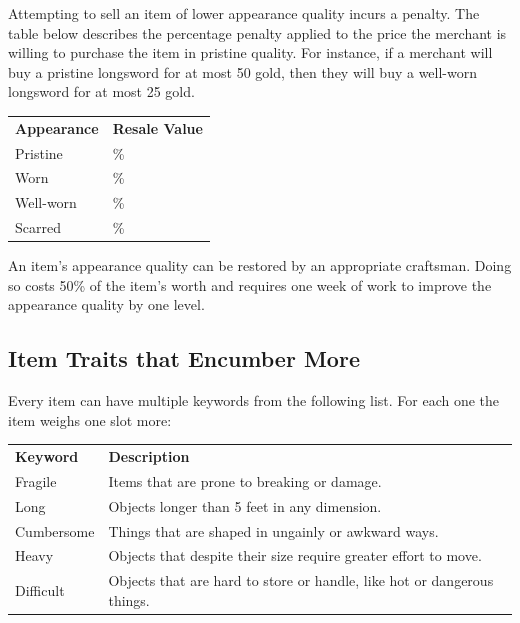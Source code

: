 \documentclass[twoside]{article}
\begin{document}
\bigbreak

Attempting to sell an item of lower appearance quality incurs a penalty. The table below describes the percentage penalty applied to the price the merchant is willing to purchase the item in pristine quality. For instance, if a merchant will buy a pristine longsword for at most 50 gold, then they will buy a well-worn longsword for at most 25 gold.

\bigbreak

\begin{center}
\noindent\begin{tabular}{>{\centering\arraybackslash}p{}>{\centering\arraybackslash}p{}}
\textbf{Appearance}&\textbf{Resale Value}\\
\rowcolor[gray]{0.75}Pristine&100\%\\
Worn&75\%\\
\rowcolor[gray]{0.75}Well-worn&50\%\\
Scarred&25\%\\
\end{tabular}
\end{center}

\bigbreak

An item's appearance quality can be restored by an appropriate craftsman. Doing so costs 50\% of the item's worth and requires one week of work to improve the appearance quality by one level.

\subsection*{Item Traits that Encumber More}

Every item can have multiple keywords from the following list. For each one the item weighs one slot more:

\bigbreak

\begin{center}
\noindent\begin{tabular}{>{\centering\arraybackslash}p{}p{}}
\textbf{Keyword}&\textbf{Description}\\
\rowcolor[gray]{0.75}Fragile&Items that are prone to breaking or damage.\\
Long&Objects longer than 5 feet in any dimension.\\
\rowcolor[gray]{0.75}Cumbersome&Things that are shaped in ungainly or awkward ways.\\
Heavy&Objects that despite their size require greater effort to move.\\
\rowcolor[gray]{0.75}Difficult&Objects that are hard to store or handle, like hot or dangerous things.\\
\end{tabular}
\end{center}
\end{document}
